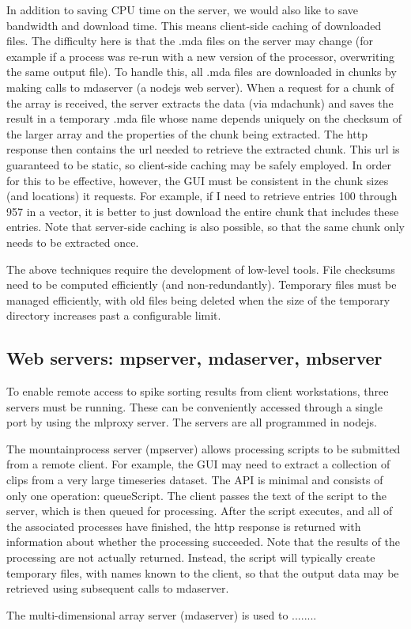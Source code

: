\documentclass{article}
\begin{document}
In addition to saving CPU time on the server, we would also like to save bandwidth and download time. This means client-side caching of downloaded files. The difficulty here is that the .mda files on the server may change (for example if a process was re-run with a new version of the processor, overwriting the same output file). To handle this, all .mda files are downloaded in chunks by making calls to mdaserver (a nodejs web server). When a request for a chunk of the array is received, the server extracts the data (via mdachunk) and saves the result in a temporary .mda file whose name depends uniquely on the checksum of the larger array and the properties of the chunk being extracted. The http response then contains the url needed to retrieve the extracted chunk. This url is guaranteed to be static, so client-side caching may be safely employed. In order for this to be effective, however, the GUI must be consistent in the chunk sizes (and locations) it requests. For example, if I need to retrieve entries 100 through 957 in a vector, it is better to just download the entire chunk that includes these entries. Note that server-side caching is also possible, so that the same chunk only needs to be extracted once.

The above techniques require the development of low-level tools. File checksums need to be computed efficiently (and non-redundantly). Temporary files must be managed efficiently, with old files being deleted when the size of the temporary directory increases past a configurable limit.

\subsection{Web servers: mpserver, mdaserver, mbserver}

To enable remote access to spike sorting results from client workstations, three servers must be running. These can be conveniently accessed through a single port by using the mlproxy server. The servers are all programmed in nodejs.

The mountainprocess server (mpserver) allows processing scripts to be submitted from a remote client. For example, the GUI may need to extract a collection of clips from a very large timeseries dataset. The API is minimal and consists of only one operation: queueScript. The client passes the text of the script to the server, which is then queued for processing. After the script executes, and all of the associated processes have finished, the http response is returned with information about whether the processing succeeded. Note that the results of the processing are not actually returned. Instead, the script will typically create temporary files, with names known to the client, so that the output data may be retrieved using subsequent calls to mdaserver.

The multi-dimensional array server (mdaserver) is used to ........
\end{document}
